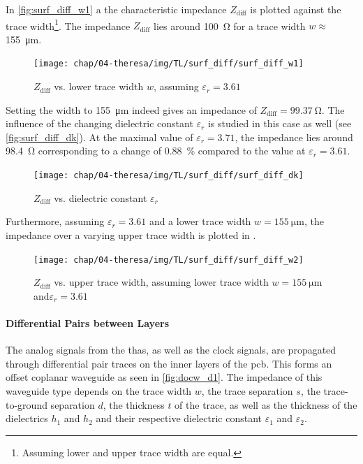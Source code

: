 In \autoref{fig:surf_diff_w1} a the characteristic impedance $Z_\text{diff}$ is plotted against the trace width\footnote{Assuming lower and upper trace width are equal.}. 
The impedance $Z_\text{diff}$ lies around \SI{100}{\ohm} for a trace width $w \approx$\SI{155}{\micro \meter}.

\begin{figure}[tbh]
	\centering
	\texttt{[image: chap/04-theresa/img/TL/surf\_diff/surf\_diff\_w1]}
	\caption[DCWG, $Z_\text{diff}$ vs. $w$]{$Z_\text{diff}$ vs. lower trace width $w$, assuming $\varepsilon_r = 3.61$}
	\label{fig:surf_diff_w1}
\end{figure}
Setting the width to \SI{155}{\micro \meter} indeed gives an impedance of $Z_\text{diff} = \SI{99.37}{\ohm}$.
The influence of the changing dielectric constant $\varepsilon_r$ is studied in this case as well (see \autoref{fig:surf_diff_dk}). 
At the maximal value of $\varepsilon_r = 3.71$, the impedance lies around \SI{98.4}{\ohm} corresponding to a change of \SI{0.88}{\percent} compared to the value at $\varepsilon_r = 3.61$. 
\begin{figure}[tbh]
	\centering
	\texttt{[image: chap/04-theresa/img/TL/surf\_diff/surf\_diff\_dk]}
	\caption[DCWG, $Z_\text{diff}$ vs. $\varepsilon_r$]{$Z_\text{diff}$ vs. dielectric constant $\varepsilon_r$}
	\label{fig:surf_diff_dk}
\end{figure}


Furthermore, assuming $\varepsilon_r = 3.61$ and a lower trace width $w = \SI{155}{\micro \meter}$, the impedance over a varying upper trace width is plotted in .


\begin{figure}[tbh]
	\centering
	\texttt{[image: chap/04-theresa/img/TL/surf\_diff/surf\_diff\_w2]}
	\caption[DCWG, $Z_\text{diff}$ vs. upper trace width]{$Z_\text{diff}$ vs. upper trace width, assuming lower trace width $w = \SI{155}{\micro \meter}$ and$\varepsilon_r = 3.61$}
	\label{fig:surf_diff_w2}
\end{figure}

\paragraph{Differential Pairs between Layers}
The analog signals from the \glspl{tha}, as well as the clock signals, are propagated through differential pair traces on the inner layers of the \gls{pcb}. 
This forms an offset coplanar waveguide as seen in \autoref{fig:docw_d1}.
The impedance of this waveguide type depends on the trace width $w$, the trace separation $s$, the trace-to-ground separation $d$, the thickness $t$ of the trace, as well as the thickness of the dielectrics $h_1$ and $h_2$ and their respective dielectric constant $\varepsilon_1$ and $\varepsilon_2$.

